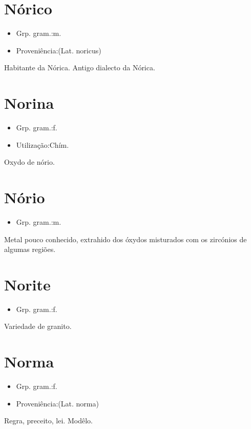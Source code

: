 \section{Nórico}
\begin{itemize}
\item {Grp. gram.:m.}
\end{itemize}
\begin{itemize}
\item {Proveniência:(Lat. \textunderscore noricus\textunderscore )}
\end{itemize}
Habitante da Nórica.
Antigo dialecto da Nórica.
\section{Norina}
\begin{itemize}
\item {Grp. gram.:f.}
\end{itemize}
\begin{itemize}
\item {Utilização:Chím.}
\end{itemize}
Oxydo de nório.
\section{Nório}
\begin{itemize}
\item {Grp. gram.:m.}
\end{itemize}
Metal pouco conhecido, extrahido dos óxydos misturados com os zircónios de algumas regiões.
\section{Norite}
\begin{itemize}
\item {Grp. gram.:f.}
\end{itemize}
Variedade de granito.
\section{Norma}
\begin{itemize}
\item {Grp. gram.:f.}
\end{itemize}
\begin{itemize}
\item {Proveniência:(Lat. \textunderscore norma\textunderscore )}
\end{itemize}
Regra, preceito, lei.
Modêlo.
